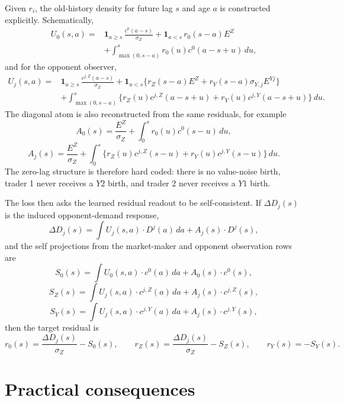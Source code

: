 \documentclass[11pt]{article}
\newcommand{\dd}{\,d}
\begin{document}
Given \(r_i\), the old-history density for future lag \(s\) and age \(a\) is
constructed explicitly.  Schematically,
\[
\begin{aligned}
U_0(s,a)
={}&
\mathbf 1_{a\ge s}\,\frac{c^0(a-s)}{\sigma_Z}
+
\mathbf 1_{a<s}\,r_0(s-a)E^Z\\
&+
\int_{\max(0,s-a)}^s
  r_0(u)c^0(a-s+u)\dd u ,
\end{aligned}
\]
and for the opponent observer,
\[
\begin{aligned}
U_j(s,a)
={}&
\mathbf 1_{a\ge s}\,\frac{c^{j,Z}(a-s)}{\sigma_Z}
+
\mathbf 1_{a<s}
  \{r_Z(s-a)E^Z+r_Y(s-a)\sigma_{Y,j}E^{Yj}\}\\
&+
\int_{\max(0,s-a)}^s
  \{r_Z(u)c^{j,Z}(a-s+u)
    +r_Y(u)c^{j,Y}(a-s+u)\}\dd u .
\end{aligned}
\]
The diagonal atom is also reconstructed from the same residuals, for example
\[
 A_0(s)
 =
 \frac{E^Z}{\sigma_Z}
 +
 \int_0^s r_0(u)c^0(s-u)\dd u,
\]
\[
 A_j(s)
 =
 \frac{E^Z}{\sigma_Z}
 +
 \int_0^s
 \{r_Z(u)c^{j,Z}(s-u)+r_Y(u)c^{j,Y}(s-u)\}\dd u .
\]
The zero-lag structure is therefore hard coded: there is no value-noise birth,
trader 1 never receives a \(Y2\) birth, and trader 2 never receives a \(Y1\)
birth.

The loss then asks the learned residual readout to be self-consistent.  If
\(\Delta D_j(s)\) is the induced opponent-demand response,
\[
  \Delta D_j(s)
  =
  \int U_j(s,a)\cdot D^j(a)\dd a
  +
  A_j(s)\cdot D^j(s),
\]
and the self projections from the market-maker and opponent observation rows
are
\[
  S_0(s)=
  \int U_0(s,a)\cdot c^0(a)\dd a + A_0(s)\cdot c^0(s),
\]
\[
  S_Z(s)=
  \int U_j(s,a)\cdot c^{j,Z}(a)\dd a + A_j(s)\cdot c^{j,Z}(s),
\]
\[
  S_Y(s)=
  \int U_j(s,a)\cdot c^{j,Y}(a)\dd a + A_j(s)\cdot c^{j,Y}(s),
\]
then the target residual is
\[
  r_0(s)=\frac{\Delta D_j(s)}{\sigma_Z}-S_0(s),\qquad
  r_Z(s)=\frac{\Delta D_j(s)}{\sigma_Z}-S_Z(s),\qquad
  r_Y(s)=-S_Y(s).
\]

\section*{Practical consequences}
\end{document}
